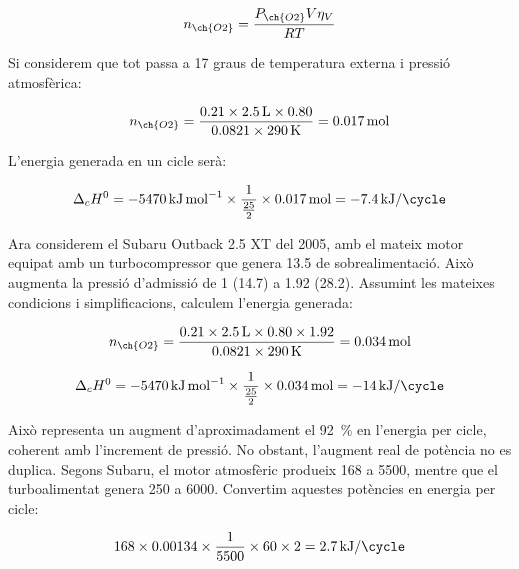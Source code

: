 \begin{equation}
    n_{\ch{O2}} = \frac{P_{\ch{O2}} V\eta_V}{RT} 
\end{equation}

Si considerem que tot passa a 17 graus de temperatura externa i pressió atmosfèrica:

\begin{equation}
    n_{\ch{O2}} = \frac{0.21 \times \qty{2.5}{\liter} \times 0.80}{0.0821 \times \qty{290}{\kelvin}} = \qty{0.017}{\mole}
\end{equation}

L'energia generada en un cicle serà:

\begin{equation}
    \Delta_cH^0 = \qty{-5470}{\kilo\joule\per\mole} \times \frac{1}{\frac{25}{2}} \times \qty{0.017}{\mole} = \qty{-7.4}{\kilo\joule\per\cycle}
\end{equation}

Ara considerem el Subaru Outback 2.5 XT del 2005, amb el mateix motor equipat amb un turbocompressor que genera \qty{13.5}{\psi} de sobrealimentació. Això augmenta la pressió d'admissió de \qty{1}{\atm} (\qty{14.7}{\psi}) a \qty{1.92}{\atm} (\qty{28.2}{\psi}). Assumint les mateixes condicions i simplificacions, calculem l'energia generada:

\begin{equation}
    n_{\ch{O2}} = \frac{0.21 \times \qty{2.5}{\liter} \times 0.80 \times 1.92}{0.0821 \times \qty{290}{\kelvin}} = \qty{0.034}{\mole}
\end{equation}

\begin{equation}
    \Delta_cH^0 = \qty{-5470}{\kilo\joule\per\mole} \times \frac{1}{\frac{25}{2}} \times \qty{0.034}{\mole} = \qty{-14}{\kilo\joule\per\cycle}
\end{equation}

Això representa un augment d'aproximadament el \qty{92}{\percent} en l'energia per cicle, coherent amb l'increment de pressió. No obstant, l'augment real de potència no es duplica. Segons Subaru, el motor atmosfèric produeix \qty{168}{\hp} a \qty{5500}{\rpm}, mentre que el turboalimentat genera \qty{250}{\hp} a \qty{6000}{\rpm}. Convertim aquestes potències en energia per cicle:

\begin{equation}
    168 \times 0.00134 \times \frac{1}{5500} \times 60 \times 2 = \qty{2.7}{\kilo\joule\per\cycle}
\end{equation}

